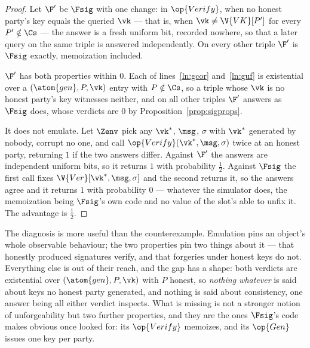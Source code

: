 \documentclass[10pt,oneside,openany]{book}
\theoremstyle{accentdef}
\theoremstyle{accentplain}
\begin{document}
\begin{proof}
Let $\F'$ be $\Fsig$ with one change: in $\op{Verify}$, when no honest party's key equals the
queried $\vk$ --- that is, when $\vk \neq \V{VK}[P']$ for every $P' \notin \Cs$ --- the answer is
a fresh uniform bit, recorded nowhere, so that a later query on the same triple is answered
independently. On every other triple $\F'$ is $\Fsig$ exactly, memoization included.

$\F'$ has both properties within $0$. Each of lines~\ref{ln:gcor} and~\ref{ln:guf} is existential
over a $(\atom{gen},P,\vk)$ entry with $P \notin \Cs$, so a triple whose $\vk$ is no honest party's
key witnesses neither, and on all other triples $\F'$ answers as $\Fsig$ does, whose verdicts are
$0$ by Proposition~\ref{prop:sigprops}.

It does not emulate. Let $\Zenv$ pick any $\vk^{*}$, $\msg$, $\sigma$ with $\vk^{*}$ generated by
nobody, corrupt no one, and call $\op{Verify}(\vk^{*},\msg,\sigma)$ twice at an honest party,
returning $1$ if the two answers differ. Against $\F'$ the answers are independent uniform bits,
so it returns $1$ with probability $\tfrac12$. Against $\Fsig$ the first call fixes
$\V{Ver}[\vk^{*},\msg,\sigma]$ and the second returns it, so the answers agree and it returns $1$
with probability $0$ --- whatever the simulator does, the memoization being $\Fsig$'s own code and
no value of the slot's able to unfix it. The advantage is $\tfrac12$.
\end{proof}

The diagnosis is more useful than the counterexample. Emulation pins an object's whole observable
behaviour; the two properties pin two things about it --- that honestly produced signatures verify,
and that forgeries under honest keys do not. Everything else is out of their reach, and the gap
has a shape: both verdicts are existential over $(\atom{gen},P,\vk)$ with $P$ honest, so
\emph{nothing whatever} is said about keys no honest party generated, and nothing is said about
consistency, one answer being all either verdict inspects. What is missing is not a stronger
notion of unforgeability but two further properties, and they are the ones $\Fsig$'s code makes
obvious once looked for: its $\op{Verify}$ memoizes, and its $\op{Gen}$ issues one key per party.
\end{document}

